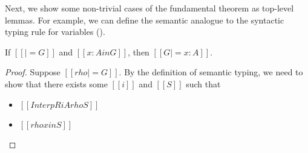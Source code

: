 \documentclass[acmsmall,screen=true,
\ifpublic review=false\else,review=true\fi
  ,anonymous=\ifanonymous true\else false\fi]{acmart}
\newcommand{\yl}[1]{}
\begin{document}
Next, we show some non-trivial cases of the fundamental theorem as
top-level lemmas. For example, we can define the semantic analogue to the
syntactic typing rule for variables ().
\begin{lemma}[ST-Var]
  \label{lemma:stvar}
  If $[[|= G]]$ and $[[x : A in G]]$, then $[[G |= x : A]]$.
\end{lemma}
\begin{proof}
  Suppose $[[rho |= G]]$. By the definition of semantic typing, we
  need to show that there exists some $[[i]]$ and $[[S]]$ such that
  \begin{itemize}
  \item $[[InterpR i A { rho } S]]$
  \item $[[rho x in S]]$
  \end{itemize}
  \yl{todo}

\end{proof}
\end{document}
